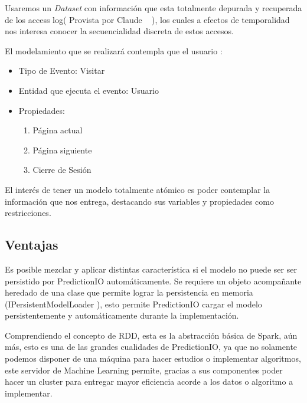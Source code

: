   Usaremos un \emph{Dataset} con información que esta totalmente depurada y recuperada de los access log( Provista por Claude \etal~\cite{Claude2014} ), los cuales a efectos de temporalidad nos interesa conocer la secuencialidad discreta de estos accesos.
  



  El modelamiento que se realizará contempla que el usuario :


    \begin{itemize}
      \item Tipo de Evento: Visitar
      \item Entidad que ejecuta el evento: Usuario
      \item Propiedades:
          \begin{enumerate}
            \item Página actual
            \item Página siguiente
            \item Cierre de Sesión
          \end{enumerate}
    \end{itemize}



    El interés de tener un modelo totalmente atómico es poder contemplar la información que nos entrega, destacando sus variables y propiedades como restricciones.



\subsection{Ventajas }


  Es posible mezclar y aplicar distintas característica si el modelo no puede ser ser persistido por PredictionIO automáticamente. Se requiere un objeto acompañante heredado de una clase que permite lograr la persistencia en memoria (IPersistentModelLoader ), esto permite PredictionIO  cargar el modelo persistentemente y automáticamente durante la implementación.



  Comprendiendo el concepto de RDD, esta es la abstracción básica de Spark, aún más, esto es una de las grandes cualidades de PredictionIO, ya que no solamente podemos disponer de una máquina para hacer estudios o implementar algoritmos, este servidor de Machine Learning permite, gracias a sus componentes poder hacer un cluster para entregar mayor eficiencia acorde a los datos o algoritmo a implementar.

